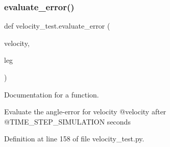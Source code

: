 \subsubsection{\texorpdfstring{evaluate\_error()}{evaluate\_error()}}
{\footnotesize\ttfamily def velocity\+\_\+test.\+evaluate\+\_\+error (\begin{DoxyParamCaption}\item[{}]{velocity,  }\item[{}]{leg }\end{DoxyParamCaption})}



Documentation for a function. 

Evaluate the angle-\/error for velocity @velocity after @\+T\+I\+M\+E\+\_\+\+S\+T\+E\+P\+\_\+\+S\+I\+M\+U\+L\+A\+T\+I\+ON seconds 

Definition at line 158 of file velocity\+\_\+test.\+py.



